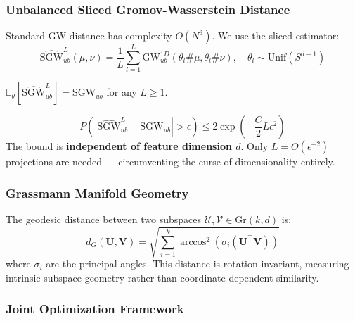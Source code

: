 \subsubsection{Unbalanced Sliced Gromov-Wasserstein Distance}

Standard GW distance has complexity $O(N^3)$. We use the sliced estimator:
\begin{equation}\label{eq:sgw}
    \widehat{\text{SGW}}_{ub}^L(\mu, \nu) =
    \frac{1}{L}\sum_{l=1}^L \text{GW}_{ub}^{1D}(\theta_l\#\mu, \theta_l\#\nu),
    \quad \theta_l \sim \text{Unif}(S^{d-1})
\end{equation}

\begin{theorem}[Unbiasedness]\label{thm:unbiasedness}
$\mathbb{E}_\theta[\widehat{\text{SGW}}_{ub}^L] = \text{SGW}_{ub}$ for any $L \geq 1$.
\end{theorem}

\begin{theorem}\label{thm:dimension-independentconcentration}
\begin{equation}
    P\left(|\widehat{\text{SGW}}_{ub}^L - \text{SGW}_{ub}| > \epsilon\right)
    \leq 2\exp\left(-\frac{C}{2}L\epsilon^2\right)
\end{equation}
The bound is \textbf{independent of feature dimension $d$}. Only
$L = O(\epsilon^{-2})$ projections are needed — circumventing the curse of
dimensionality entirely.

\end{theorem}

\subsubsection{Grassmann Manifold Geometry}

The geodesic distance between two subspaces $\mathcal{U}, \mathcal{V} \in \text{Gr}(k,d)$ is:
\begin{equation}
    d_G(\mathbf{U}, \mathbf{V}) = \sqrt{\sum_{i=1}^k \arccos^2(\sigma_i(\mathbf{U}^\top\mathbf{V}))}
\end{equation}
where $\sigma_i$ are the principal angles. This distance is rotation-invariant,
measuring intrinsic subspace geometry rather than coordinate-dependent similarity.

\subsubsection{Joint Optimization Framework}

